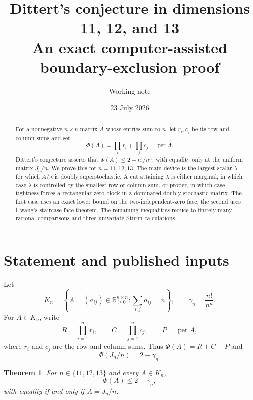 \documentclass[11pt]{article}
\title{Dittert's conjecture in dimensions 11, 12, and 13\\
\large An exact computer-assisted boundary-exclusion proof}
\author{Working note}
\date{23 July 2026}
\newtheorem{theorem}{Theorem}[section]
\theoremstyle{remark}
\newcommand{\per}{\operatorname{per}}
\newcommand{\PhiD}{\Phi}
\newcommand{\RR}{\mathbb R}
\begin{document}
\maketitle

\begin{center}
\end{center}

\begin{abstract}
For a nonnegative $n\times n$ matrix $A$ whose entries sum to $n$, let $r_i,c_j$ be its row and column sums and set
\[
 \PhiD(A)=\prod_i r_i+\prod_j c_j-\per A.
\]
Dittert's conjecture asserts that $\PhiD(A)\le 2-n!/n^n$, with equality only at the uniform matrix $J_n/n$. We prove this for $n=11,12,13$. The main device is the largest scalar $\lambda$ for which $A/\lambda$ is doubly superstochastic. A cut attaining $\lambda$ is either marginal, in which case $\lambda$ is controlled by the smallest row or column sum, or proper, in which case tightness forces a rectangular zero block in a dominated doubly stochastic matrix. The first case uses an exact lower bound on the two-independent-zero face; the second uses Hwang's staircase-face theorem. The remaining inequalities reduce to finitely many rational comparisons and three univariate Sturm calculations.
\end{abstract}

\section{Statement and published inputs}
Let
\[
 K_n=\left\{A=(a_{ij})\in\RR_{\ge0}^{n\times n}:\sum_{i,j}a_{ij}=n\right\},
 \qquad
 \gamma_n=\frac{n!}{n^n}.
\]
For $A\in K_n$, write
\[
 R=\prod_{i=1}^n r_i,\qquad C=\prod_{j=1}^n c_j,\qquad P=\per A,
\]
where $r_i$ and $c_j$ are the row and column sums. Thus $\PhiD(A)=R+C-P$ and
\[
 \PhiD(J_n/n)=2-\gamma_n.
\]

\begin{theorem}\label{thm:main}
For $n\in\{11,12,13\}$ and every $A\in K_n$,
\[
 \PhiD(A)\le 2-\gamma_n,
\]
with equality if and only if $A=J_n/n$.
\end{theorem}
\end{document}
